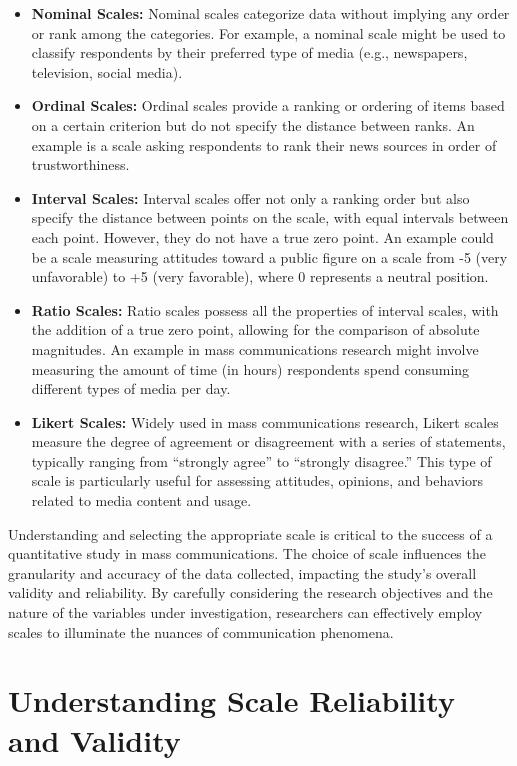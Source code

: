 \documentclass[
]{book}
\begin{document}
\begin{itemize}
\item
  \textbf{Nominal Scales:} Nominal scales categorize data without implying any order or rank among the categories. For example, a nominal scale might be used to classify respondents by their preferred type of media (e.g., newspapers, television, social media).
\item
  \textbf{Ordinal Scales:} Ordinal scales provide a ranking or ordering of items based on a certain criterion but do not specify the distance between ranks. An example is a scale asking respondents to rank their news sources in order of trustworthiness.
\item
  \textbf{Interval Scales:} Interval scales offer not only a ranking order but also specify the distance between points on the scale, with equal intervals between each point. However, they do not have a true zero point. An example could be a scale measuring attitudes toward a public figure on a scale from -5 (very unfavorable) to +5 (very favorable), where 0 represents a neutral position.
\item
  \textbf{Ratio Scales:} Ratio scales possess all the properties of interval scales, with the addition of a true zero point, allowing for the comparison of absolute magnitudes. An example in mass communications research might involve measuring the amount of time (in hours) respondents spend consuming different types of media per day.
\item
  \textbf{Likert Scales:} Widely used in mass communications research, Likert scales measure the degree of agreement or disagreement with a series of statements, typically ranging from ``strongly agree'' to ``strongly disagree.'' This type of scale is particularly useful for assessing attitudes, opinions, and behaviors related to media content and usage.
\end{itemize}

Understanding and selecting the appropriate scale is critical to the success of a quantitative study in mass communications. The choice of scale influences the granularity and accuracy of the data collected, impacting the study's overall validity and reliability. By carefully considering the research objectives and the nature of the variables under investigation, researchers can effectively employ scales to illuminate the nuances of communication phenomena.

\hypertarget{understanding-scale-reliability-and-validity}{%
\section{Understanding Scale Reliability and Validity}\label{understanding-scale-reliability-and-validity}}
\end{document}
